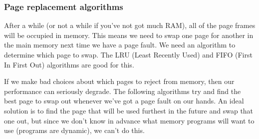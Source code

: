 \subsubsection{Page replacement algorithms}

After a while (or not a while if you've not got much RAM), all of the page
frames will be occupied in memory. This means we need to swap one page for
another in the main memory next time we have a page fault. We need an algorithm
to determine which page to swap. The LRU (Least Recently Used) and FIFO (First In
First Out) algorithms are good for this.

If we make bad choices about which pages to reject from memory, then our
performance can seriously degrade. The following algorithms try and find the
best page to swap out whenever we've got a page fault on our hands. An ideal
solution is to find the page that will be used furthest in the future and swap
that one out, but since we don't know in advance what memory programs will want
to use (programs are dynamic), we can't do this.

